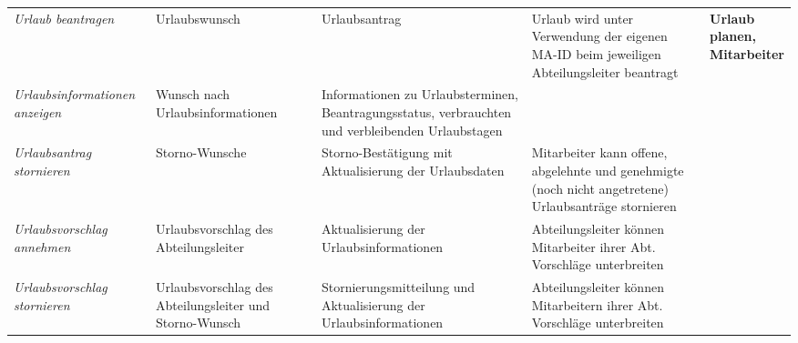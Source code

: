 {
\vspace{0,5cm}
\hspace{-3,5cm}
\footnotesize
\begin{tabular}{|p{3cm}|p{4cm}|p{4cm}|p{4cm}|p{2cm}|}
	\hline
		\textit{Urlaub beantragen} & 
		Urlaubswunsch & 
		Urlaubsantrag & 
		Urlaub wird unter Verwendung der eigenen MA-ID beim jeweiligen Abteilungsleiter beantragt & 
		\textbf{Urlaub \newline planen, \newline  Mitarbeiter } \\
	\cline{1-4}
		\textit{Urlaubsinformationen anzeigen} & 
		Wunsch nach Urlaubsinformationen & 
		Informationen zu Urlaubsterminen, Beantragungs\-status, verbrauchten und verbleibenden Urlaubstagen &  
		&  
		\\
	\cline{1-4}
		\textit{Urlaubsantrag \newline stornieren} &
		Storno-Wunsche &
		Storno-Best\"atigung mit Aktualisierung der Urlaubsdaten &
		Mitarbeiter kann offene, abgelehnte und genehmigte (noch nicht angetretene) Urlaubsantr\"age stornieren &
		\\
	\cline{1-4}
		\textit{Urlaubsvorschlag annehmen} &
		Urlaubsvorschlag des Abteilungsleiter &
		 Aktualisierung der Urlaubsinformationen &
		Abteilungsleiter k\"onnen Mitarbeiter ihrer Abt. Vorschl\"age unterbreiten &
		\\
	\cline{1-4}
		\textit{Urlaubsvorschlag \newline stornieren} &
		Urlaubsvorschlag des Abteilungsleiter und Storno-Wunsch &
		Stornierungsmitteilung und Aktualisierung der Urlaubsinformationen &
		Abteilungsleiter k\"onnen Mitarbeitern ihrer Abt. Vorschl\"age unterbreiten &
		\\
	\hline
\end{tabular}
}


